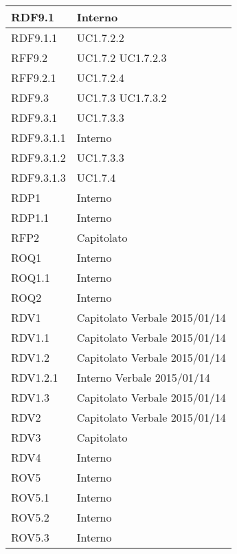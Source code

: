 \begin{center}
\begin{longtable}{| p{4cm} | p{4cm} |}
		\hline
		RDF9.1  &  Interno \\
		\hline
		RDF9.1.1  &  UC1.7.2.2 \\
		\hline
		RFF9.2  &  UC1.7.2 \newline UC1.7.2.3  \\
		\hline
		RFF9.2.1  &  UC1.7.2.4 \\
		\hline
		RDF9.3  & UC1.7.3  \newline UC1.7.3.2 \\
		\hline
		RDF9.3.1  &  UC1.7.3.3\\
		\hline
		RDF9.3.1.1  &  Interno \\
		\hline
		RDF9.3.1.2  &  UC1.7.3.3\\
		\hline
		RDF9.3.1.3  &  UC1.7.4\\
		\hline



		RDP1  &  Interno \\
		\hline
		RDP1.1  &  Interno \\
		\hline
		RFP2  &  Capitolato \\
		\hline



		ROQ1  &  Interno \\
		\hline
		ROQ1.1  &  Interno \\
		\hline
		ROQ2  &  Interno \\
		\hline




		RDV1 &  Capitolato \newline Verbale 2015/01/14 \\
		\hline
		RDV1.1  &  Capitolato \newline Verbale 2015/01/14 \\
		\hline
		RDV1.2  &  Capitolato \newline Verbale 2015/01/14 \\
		\hline
		RDV1.2.1  &  Interno \newline Verbale 2015/01/14 \\
		\hline
		RDV1.3  &  Capitolato \newline Verbale 2015/01/14 \\
		\hline
		RDV2  &  Capitolato \newline Verbale 2015/01/14 \\
		\hline
		RDV3  &  Capitolato \\
		\hline
		RDV4  &  Interno \\
		\hline
		ROV5  &  Interno \\
		\hline
		ROV5.1  &  Interno \\
		\hline
		ROV5.2  &  Interno \\
		\hline
		ROV5.3  &  Interno \\
		\hline


	\end{longtable}
	\egroup
	\end{center}

